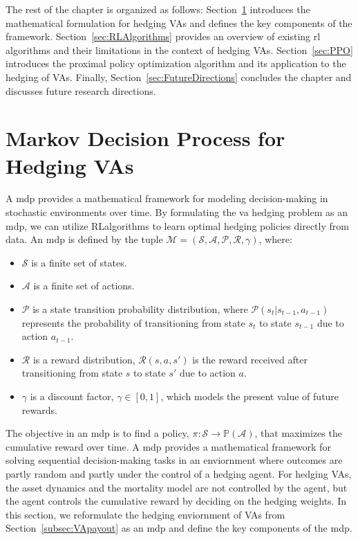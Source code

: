 The rest of the chapter is organized as follows: 
Section~\ref{sec:MDP} introduces the mathematical formulation for hedging VAs and defines the key components of the framework.
Section~\ref{sec:RLAlgorithms} provides an overview of existing \gls{rl} algorithms and their limitations in the context of hedging VAs.
Section~\ref{sec:PPO} introduces the proximal policy optimization algorithm and its application to the hedging of VAs.
Finally, Section~\ref{sec:FutureDirections} concludes the chapter and discusses future research directions.

\section{Markov Decision Process for Hedging VAs} \label{sec:MDP}

A \gls{mdp} provides a mathematical framework for modeling decision-making in stochastic environments over time. 
By formulating the \gls{va} hedging problem as an \gls{mdp}, we can utilize RLalgorithms to learn optimal hedging policies directly from data.
An \gls{mdp} is defined by the tuple $\mathcal{M} = (\mathcal{S}, \mathcal{A}, \mathcal{P}, \mathcal{R}, \gamma)$, where:

\begin{itemize}
    \item $\mathcal{S}$ is a finite set of states.
    \item $\mathcal{A}$ is a finite set of actions.
    \item $\mathcal{P}$ is a state transition probability distribution, where $\mathcal{P}(s_{t}|s_{t-1}, a_{t-1})$ represents the probability of transitioning from state $s_t$ to state $s_{t-1}$ due to action $a_{t-1}$.
    \item $\mathcal{R}$ is a reward distribution, $\mathcal{R}(s, a, s')$ is the reward received after transitioning from state $s$ to state $s'$ due to action $a$.
    \item $\gamma$ is a discount factor, $\gamma \in [0,1]$,  which models the present value of future rewards.
\end{itemize}

The objective in an \gls{mdp} is to find a policy, $\pi: \mathcal{S} \rightarrow \mathbb{P}(\mathcal{A})$, that maximizes the cumulative reward over time.
A \gls{mdp} provides a mathematical framework for solving sequential decision-making tasks in an enviornment where outcomes are partly random and partly under the control of a hedging agent. 
For hedging VAs, the asset dynamics and the mortality model are not controlled by the agent, but the agent controls the cumulative reward by deciding on the hedging weights.
In this section, we reformulate the hedging enviornment of VAs from Section~\ref{subsec:VApayout} as an \gls{mdp} and define the key components of the \gls{mdp}.

